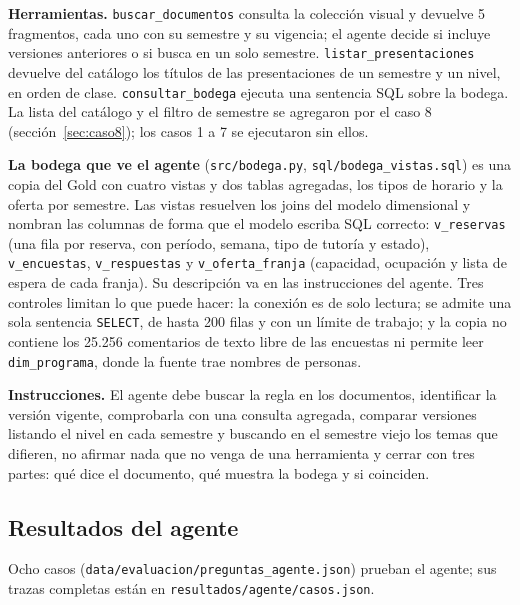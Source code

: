 \documentclass[11pt,letterpaper]{article}
\newcommand{\cod}[1]{\texttt{\small #1}}
\begin{document}
\textbf{Herramientas.} \cod{buscar\_documentos} consulta la colección visual y devuelve 5 fragmentos, cada uno con su semestre y su vigencia; el agente decide si incluye versiones anteriores o si busca en un solo semestre. \cod{listar\_presentaciones} devuelve del catálogo los títulos de las presentaciones de un semestre y un nivel, en orden de clase. \cod{consultar\_bodega} ejecuta una sentencia SQL sobre la bodega. La lista del catálogo y el filtro de semestre se agregaron por el caso 8 (sección~\ref{sec:caso8}); los casos 1 a 7 se ejecutaron sin ellos.

\textbf{La bodega que ve el agente} (\cod{src/bodega.py}, \cod{sql/bodega\_vistas.sql}) es una copia del Gold con cuatro vistas y dos tablas agregadas, los tipos de horario y la oferta por semestre. Las vistas resuelven los joins del modelo dimensional y nombran las columnas de forma que el modelo escriba SQL correcto: \cod{v\_reservas} (una fila por reserva, con período, semana, tipo de tutoría y estado), \cod{v\_encuestas}, \cod{v\_respuestas} y \cod{v\_oferta\_franja} (capacidad, ocupación y lista de espera de cada franja). Su descripción va en las instrucciones del agente. Tres controles limitan lo que puede hacer: la conexión es de solo lectura; se admite una sola sentencia \cod{SELECT}, de hasta 200 filas y con un límite de trabajo; y la copia no contiene los 25.256 comentarios de texto libre de las encuestas ni permite leer \cod{dim\_programa}, donde la fuente trae nombres de personas.

\textbf{Instrucciones.} El agente debe buscar la regla en los documentos, identificar la versión vigente, comprobarla con una consulta agregada, comparar versiones listando el nivel en cada semestre y buscando en el semestre viejo los temas que difieren, no afirmar nada que no venga de una herramienta y cerrar con tres partes: qué dice el documento, qué muestra la bodega y si coinciden.

\subsection{Resultados del agente}

Ocho casos (\cod{data/evaluacion/preguntas\_agente.json}) prueban el agente; sus trazas completas están en \cod{resultados/agente/casos.json}.
\end{document}
